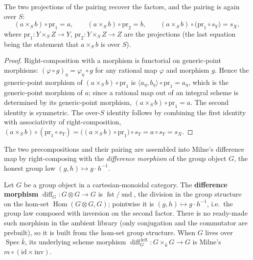 \begin{lemma}\leanok
  \label{lem:rationalMap_prod_proj}
  The two projections of the pairing recover the factors, and the pairing is again over
  \(S\):
  \[
    (a \times_S b) \circ \mathrm{pr}_1 = a,
    \qquad
    (a \times_S b) \circ \mathrm{pr}_2 = b,
    \qquad
    (a \times_S b) \circ \bigl(\mathrm{pr}_1 \circ s_Y\bigr) = s_X,
  \]
  where \(\mathrm{pr}_1 \colon Y \times_S Z \to Y\), \(\mathrm{pr}_2 \colon Y \times_S Z \to Z\)
  are the projections (the last equation being the statement that \(a \times_S b\) is over
  \(S\)).
\end{lemma}
\begin{proof}\leanok
  Right-composition with a morphism is functorial on generic-point morphisms:
  \((\varphi \circ g)_\eta = \varphi_\eta \circ g\) for any rational map \(\varphi\) and
  morphism \(g\). Hence the generic-point morphism of \((a \times_S b) \circ \mathrm{pr}_1\) is
  \(\langle a_\eta, b_\eta\rangle \circ \mathrm{pr}_1 = a_\eta\), which is the generic-point
  morphism of \(a\); since a rational map out of an integral scheme is determined by its
  generic-point morphism, \((a \times_S b) \circ \mathrm{pr}_1 = a\). The second identity is
  symmetric. The over-\(S\) identity follows by combining the first identity with
  associativity of right-composition, \((a \times_S b) \circ (\mathrm{pr}_1 \circ s_Y) =
  \bigl((a \times_S b) \circ \mathrm{pr}_1\bigr) \circ s_Y = a \circ s_Y = s_X\).
\end{proof}

The two precompositions and their pairing are assembled into Milne's difference map by
right-composing with the \emph{difference morphism} of the group object \(G\), the honest
group law \((g,h) \mapsto g \cdot h^{-1}\).

\begin{definition}\leanok
  \label{def:grpObj_diff}
  Let \(G\) be a group object in a cartesian-monoidal category. The \textbf{difference
  morphism} \(\operatorname{diff}_G \colon G \otimes G \to G\) is
  \(\operatorname{fst} / \operatorname{snd}\), the division in the group structure on the
  hom-set \(\operatorname{Hom}(G \otimes G, G)\); pointwise it is
  \((g,h) \mapsto g \cdot h^{-1}\), i.e.\ the group law composed with inversion on the second
  factor. There is no ready-made such morphism in the ambient library (only conjugation and
  the commutator are prebuilt), so it is built from the hom-set group structure. When \(G\)
  lives over \(\operatorname{Spec}\bar k\), its underlying scheme morphism
  \(\operatorname{diff}_G^{\,\mathrm{left}} \colon G \times_{\bar k} G \to G\) is Milne's
  \(m \circ (\mathrm{id} \times \mathrm{inv})\).
\end{definition}

